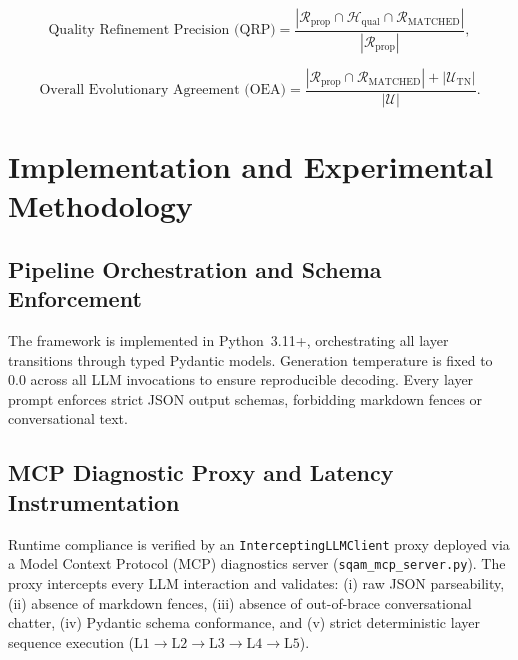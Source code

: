 \documentclass[journal]{IEEEtran}
\begin{document}
\begin{equation}
\text{Quality Refinement Precision (QRP)} = \frac{|\mathcal{R}_{\text{prop}} \cap \mathcal{H}_{\text{qual}} \cap \mathcal{R}_{\text{MATCHED}}|}{|\mathcal{R}_{\text{prop}}|},
\label{eq:qrp}
\end{equation}

\begin{equation}
\text{Overall Evolutionary Agreement (OEA)} = \frac{|\mathcal{R}_{\text{prop}} \cap \mathcal{R}_{\text{MATCHED}}| + |\mathcal{U}_{\text{TN}}|}{|\mathcal{U}|}.
\label{eq:oea}
\end{equation}

\section{Implementation and Experimental Methodology}
\label{sec:implementation}

\subsection{Pipeline Orchestration and Schema Enforcement}
\label{sec:orchestration}

The framework is implemented in Python~3.11+, orchestrating all layer transitions through typed Pydantic models. Generation temperature is fixed to $0.0$ across all LLM invocations to ensure reproducible decoding. Every layer prompt enforces strict JSON output schemas, forbidding markdown fences or conversational text.

\subsection{MCP Diagnostic Proxy and Latency Instrumentation}
\label{sec:mcp-instrumentation}

Runtime compliance is verified by an \texttt{InterceptingLLMClient} proxy deployed via a Model Context Protocol (MCP) diagnostics server (\texttt{sqam\_mcp\_server.py}). The proxy intercepts every LLM interaction and validates: (i) raw JSON parseability, (ii) absence of markdown fences, (iii) absence of out-of-brace conversational chatter, (iv) Pydantic schema conformance, and (v) strict deterministic layer sequence execution ($\text{L1} \to \text{L2} \to \text{L3} \to \text{L4} \to \text{L5}$).
\end{document}
